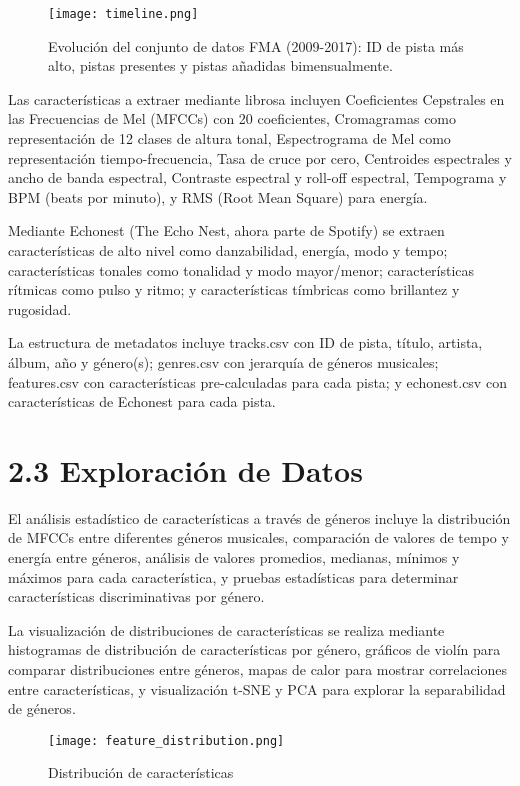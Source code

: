 \documentclass{article}
\begin{document}
\begin{figure}[H]
    \centering
    \texttt{[image: timeline.png]}
    \caption{Evolución del conjunto de datos FMA (2009-2017): ID de pista más alto, pistas presentes y pistas añadidas bimensualmente.}
    \label{fig:timeline_fma}
\end{figure}

Las características a extraer mediante librosa incluyen Coeficientes Cepstrales en las Frecuencias de Mel (MFCCs) con 20 coeficientes, Cromagramas como representación de 12 clases de altura tonal, Espectrograma de Mel como representación tiempo-frecuencia, Tasa de cruce por cero, Centroides espectrales y ancho de banda espectral, Contraste espectral y roll-off espectral, Tempograma y BPM (beats por minuto), y RMS (Root Mean Square) para energía.

Mediante Echonest (The Echo Nest, ahora parte de Spotify) se extraen características de alto nivel como danzabilidad, energía, modo y tempo; características tonales como tonalidad y modo mayor/menor; características rítmicas como pulso y ritmo; y características tímbricas como brillantez y rugosidad.

La estructura de metadatos incluye tracks.csv con ID de pista, título, artista, álbum, año y género(s); genres.csv con jerarquía de géneros musicales; features.csv con características pre-calculadas para cada pista; y echonest.csv con características de Echonest para cada pista.

\section*{2.3 Exploración de Datos}
El análisis estadístico de características a través de géneros incluye la distribución de MFCCs entre diferentes géneros musicales, comparación de valores de tempo y energía entre géneros, análisis de valores promedios, medianas, mínimos y máximos para cada característica, y pruebas estadísticas para determinar características discriminativas por género.

La visualización de distribuciones de características se realiza mediante histogramas de distribución de características por género, gráficos de violín para comparar distribuciones entre géneros, mapas de calor para mostrar correlaciones entre características, y visualización t-SNE y PCA para explorar la separabilidad de géneros.

\begin{figure}[H]
    \centering
    \texttt{[image: feature\_distribution.png]}
    \caption{Distribución de características}
    \label{fig:enter-label}
\end{figure}
\end{document}

